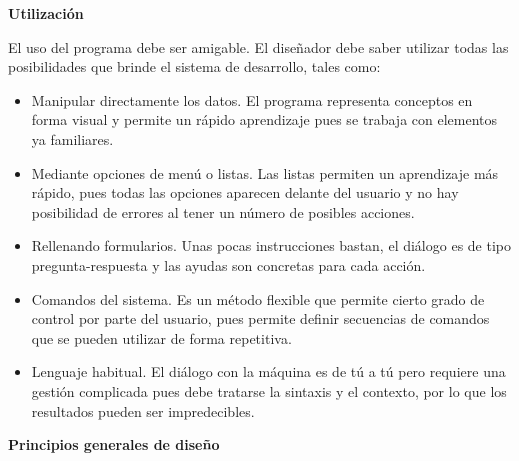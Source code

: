 \textbf{Utilización}

El uso del programa debe ser amigable. El diseñador debe saber utilizar todas las posibilidades que brinde el sistema de desarrollo, tales como:
\begin{itemize}
    \item Manipular directamente los datos. El programa representa conceptos en forma visual y permite un rápido aprendizaje pues se trabaja con elementos ya familiares.
    \item Mediante opciones de menú o listas. Las listas permiten un aprendizaje más rápido, pues todas las opciones aparecen delante del usuario y no hay posibilidad de errores al tener un número de posibles acciones.
    \item Rellenando formularios. Unas pocas instrucciones bastan, el diálogo es de tipo pregunta-respuesta y las ayudas son concretas para cada acción.
    \item Comandos del sistema. Es un método flexible que permite cierto grado de control por parte del usuario, pues permite definir secuencias de comandos que se pueden utilizar de forma repetitiva.
    \item Lenguaje habitual. El diálogo con la máquina es de tú a tú pero requiere una gestión complicada pues debe tratarse la sintaxis y el contexto, por lo que los resultados pueden ser impredecibles.
\end{itemize}

\textbf{Principios generales de diseño}


